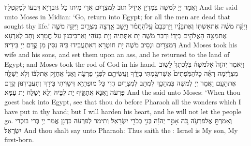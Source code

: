 {וַאֲמַר יְיָ לְמֹשֶׁה בְּמִדְיָן אִיזֵיל תּוּב לְמִצְרָיִם אֲרֵי מִיתוּ כָל גּוּבְרַיָּא דִּבְעוֹ לְמִקְטְלָךְ׃}
{And the \lord\space said unto Moses in Midian: ‘Go, return into Egypt; for all the men are dead that sought thy life.’}{}
{וַיִּקַּ֨ח מֹשֶׁ֜ה אֶת\maqqaf אִשְׁתּ֣וֹ וְאֶת\maqqaf בָּנָ֗יו וַיַּרְכִּבֵם֙ עַֽל\maqqaf הַחֲמֹ֔ר וַיָּ֖שׇׁב אַ֣רְצָה מִצְרָ֑יִם וַיִּקַּ֥ח מֹשֶׁ֛ה אֶת\maqqaf מַטֵּ֥ה הָאֱלֹהִ֖ים בְּיָדֽוֹ׃}
{וּדְבַר מֹשֶׁה יָת אִתְּתֵיהּ וְיָת בְּנוֹהִי וְאַרְכֵּיבִנּוּן עַל חֲמָרָא וְתָב לְאַרְעָא דְּמִצְרָיִם וּנְסֵיב מֹשֶׁה יָת חוּטְרָא דְּאִתְעֲבִידוּ בֵּיהּ נִסִּין מִן קֳדָם יְיָ בִּידֵיהּ׃}
{And Moses took his wife and his sons, and set them upon an ass, and he returned to the land of Egypt; and Moses took the rod of God in his hand.}{}
{וַיֹּ֣אמֶר יְהֹוָה֮ אֶל\maqqaf מֹשֶׁה֒ בְּלֶכְתְּךָ֙ לָשׁ֣וּב מִצְרַ֔יְמָה רְאֵ֗ה כׇּל\maqqaf הַמֹּֽפְתִים֙ אֲשֶׁר\maqqaf שַׂ֣מְתִּי בְיָדֶ֔ךָ וַעֲשִׂיתָ֖ם לִפְנֵ֣י פַרְעֹ֑ה וַאֲנִי֙ אֲחַזֵּ֣ק אֶת\maqqaf לִבּ֔וֹ וְלֹ֥א יְשַׁלַּ֖ח אֶת\maqqaf הָעָֽם׃}
{וַאֲמַר יְיָ לְמֹשֶׁה בִּמְהָכָךְ לִמְתָּב לְמִצְרַיִם חֲזִי כָּל מוֹפְתַיָּא דְּשַׁוִּיתִי בִּידָךְ וְתַעֲבֵידִנּוּן קֳדָם פַּרְעֹה וַאֲנָא אֲתַקֵּיף יָת לִבֵּיהּ וְלָא יְשַׁלַּח יָת עַמָּא׃}
{And the \lord\space said unto Moses: ‘When thou goest back into Egypt, see that thou do before Pharaoh all the wonders which I have put in thy hand; but I will harden his heart, and he will not let the people go.}{}
{וְאָמַרְתָּ֖ אֶל\maqqaf פַּרְעֹ֑ה כֹּ֚ה אָמַ֣ר יְהֹוָ֔ה בְּנִ֥י בְכֹרִ֖י יִשְׂרָאֵֽל׃}
{וְתֵימַר לְפַרְעֹה כִּדְנָן אֲמַר יְיָ בְּרִי בּוּכְרִי יִשְׂרָאֵל׃}
{And thou shalt say unto Pharaoh: Thus saith the \lord: Israel is My son, My first-born.}{}
